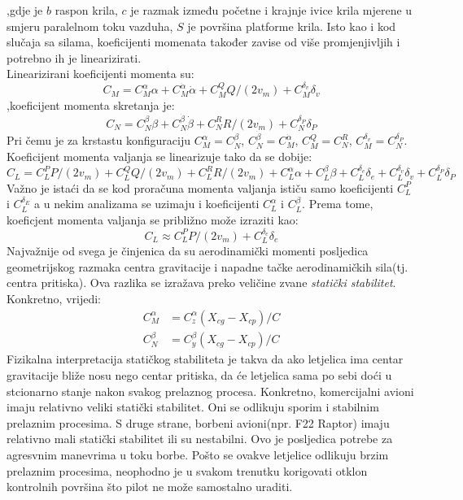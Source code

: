  ,gdje je $b$ raspon krila, $c$ je razmak između početne i krajnje ivice krila mjerene 
 u smjeru paralelnom toku vazduha, $S$ je površina platforme krila. 
 Isto kao i kod slučaja sa silama, koeficijenti momenata također zavise od više promjenjivljih 
 i potrebno ih je linearizirati. \\
 Linearizirani koeficijenti momenta  su:
 \begin{equation}
     C_M=C_M^{\alpha}\alpha +C_M^{\dot{\alpha}}\dot{\alpha} + C_M^Q Q/(2v_m)+C_M^{\delta _v}\delta _v
 \end{equation}
 ,koeficijent momenta skretanja je:
 \begin{equation}
     C_N=C_N^{\beta}\beta + C_N^{\dot{\beta}}\dot{\beta}+C_N^R R/(2v_m)+C_N^{\delta _P}\delta _P
 \end{equation} 
 Pri čemu je za krstastu konfiguraciju $C_M^{\alpha}=C_N^{\beta}$, $C_N^{\dot{\beta}}=C_M^{\dot{\alpha}}$,
 $ C_M^Q=C_N^R $, $C_M^{\delta _v}=C_N^{\delta _P}$.
 Koeficijent momenta valjanja se linearizuje tako da se dobije:
 \begin{equation}
     C_L = C_L^PP/(2v_m)+C_L^QQ/(2v_m)+C_L^RR/(2v_m) +C_L^\alpha \alpha +C_L^\beta \beta + C_L^{\delta _e} \delta _e +C_L^{\delta _v} \delta _v
     +C_L^{\delta _P} \delta _P
 \end{equation}
 Važno je istaći da se kod proračuna momenta valjanja ističu samo koeficijenti $C_L^P$ i $C_L^{\delta _E}$ a u nekim analizama 
 se uzimaju i koeficijenti $C_L^\alpha$ i $C_L^\beta$. Prema tome, koeficjent momenta 
 valjanja se približno može izraziti kao:
 \begin{equation}
    C_L \approx C_L^PP/(2v_m)+C_L^{\delta _e} \delta _e
 \end{equation}
 Najvažnije od svega je činjenica da su aerodinamički momenti posljedica 
 geometrijskog razmaka centra gravitacije i napadne tačke aerodinamičkih sila(tj. centra pritiska).
 Ova razlika se izražava preko veličine zvane \textit{statički stabilitet}. Konkretno, vrijedi:
\begin{align}
    C_M^\alpha &= C_z^\alpha(X_{cg}-X_{cp})/C\\
    C_N^\beta &= C_y^\beta(X_{cg}-X_{cp})/C
\end{align}
Fizikalna interpretacija statičkog stabiliteta je takva da ako letjelica ima centar gravitacije bliže nosu nego 
centar pritiska, da će letjelica sama po sebi doći u stcionarno stanje nakon svakog prelaznog procesa. 
Konkretno, komercijalni avioni imaju relativno veliki statički stabilitet. Oni se odlikuju sporim i stabilnim 
prelaznim procesima. S druge strane, borbeni avioni(npr. F22 Raptor) imaju relativno mali statički stabilitet ili su 
nestabilni. Ovo je posljedica potrebe za agresvnim manevrima u toku borbe. Pošto se ovakve letjelice odlikuju brzim prelaznim 
procesima, neophodno je u svakom trenutku korigovati otklon kontrolnih površina što pilot ne može samostalno uraditi. 
